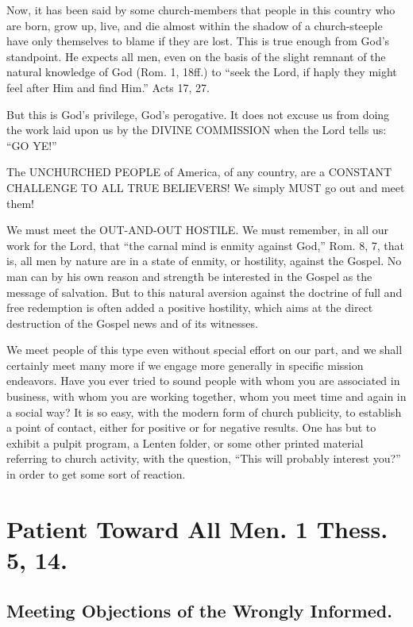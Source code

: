 \documentclass[
]{book}
\begin{document}
Now, it has been said by some church-members that people in this country who are born, grow up, live, and die almost within the shadow of a church-steeple have only themselves to blame if they are lost. This is true enough from God's standpoint. He expects all men, even on the basis of the slight remnant of the natural knowledge of God (Rom. 1, 18ff.) to ``seek the Lord, if haply they might feel after Him and find Him.'' Acts 17, 27.

But this is God's privilege, God's perogative. It does not excuse us from doing the work laid upon us by the DIVINE COMMISSION when the Lord tells us: ``GO YE!''

The UNCHURCHED PEOPLE of America, of any country, are a CONSTANT CHALLENGE TO ALL TRUE BELIEVERS! We simply MUST go out and meet them!

We must meet the OUT-AND-OUT HOSTILE. We must remember, in all our work for the Lord, that ``the carnal mind is enmity against God,'' Rom. 8, 7, that is, all men by nature are in a state of enmity, or hostility, against the Gospel. No man can by his own reason and strength be interested in the Gospel as the message of salvation. But to this natural aversion against the doctrine of full and free redemption is often added a positive hostility, which aims at the direct destruction of the Gospel news and of its witnesses.

We meet people of this type even without special effort on our part, and we shall certainly meet many more if we engage more generally in specific mission endeavors. Have you ever tried to sound people with whom you are associated in business, with whom you are working together, whom you meet time and again in a social way? It is so easy, with the modern form of church publicity, to establish a point of contact, either for positive or for negative results. One has but to exhibit a pulpit program, a Lenten folder, or some other printed material referring to church activity, with the question, ``This will probably interest you?'' in order to get some sort of reaction.

\hypertarget{patient-toward-all-men.-1-thess.-5-14.}{%
\chapter{Patient Toward All Men. 1 Thess. 5, 14.}\label{patient-toward-all-men.-1-thess.-5-14.}}

\hypertarget{meeting-objections-of-the-wrongly-informed.}{%
\section*{Meeting Objections of the Wrongly Informed.}\label{meeting-objections-of-the-wrongly-informed.}}
\end{document}
